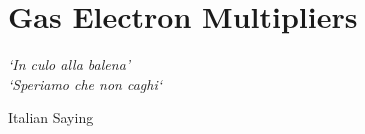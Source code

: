 \chapter{Gas Electron Multipliers}
\epigraph{\itshape `In culo alla balena' \\ `Speriamo che non caghi`}{Italian Saying }



